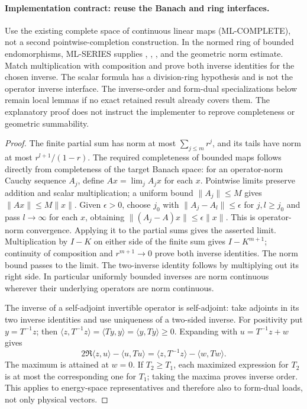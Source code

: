 \documentclass[11pt,a4paper]{article}
\theoremstyle{remark}\newtheorem{remark}[theorem]{Remark}
\begin{document}
\paragraph{Implementation contract: reuse the Banach and ring interfaces.}
Use the existing complete space of continuous linear maps (ML-COMPLETE), not a second pointwise-completion construction. In the normed ring of bounded endomorphisms, ML-SERIES supplies , , , and the geometric norm estimate. Match multiplication with composition and prove both inverse identities for the chosen inverse. The scalar formula  has a division-ring hypothesis and is not the operator inverse interface. The inverse-order and form-dual specializations below remain local lemmas if no exact retained result already covers them. The explanatory proof does not instruct the implementer to reprove completeness or geometric summability.
\begin{proof}
The finite partial sum has norm at most $\sum_{j\leq m}r^j$, and its tails have norm at most $r^{l+1}/(1-r)$. The required completeness of bounded maps follows directly from completeness of the target Banach space: for an operator-norm Cauchy sequence $A_j$, define $Ax=\lim_j A_jx$ for each $x$. Pointwise limits preserve addition and scalar multiplication; a uniform bound $\|A_j\|\leq M$ gives $\|Ax\|\leq M\|x\|$. Given $\epsilon>0$, choose $j_0$ with $\|A_j-A_l\|\leq\epsilon$ for $j,l\geq j_0$ and pass $l\to\infty$ for each $x$, obtaining $\|(A_j-A)x\|\leq\epsilon\|x\|$. This is operator-norm convergence. Applying it to the partial sums gives the asserted limit. Multiplication by $I-K$ on either side of the finite sum gives $I-K^{m+1}$; continuity of composition and $r^{m+1}\to0$ prove both inverse identities. The norm bound passes to the limit. The two-inverse identity follows by multiplying out its right side. In particular uniformly bounded inverses are norm continuous wherever their underlying operators are norm continuous.

The inverse of a self-adjoint invertible operator is self-adjoint: take adjoints in its two inverse identities and use uniqueness of a two-sided inverse. For positivity put $y=T^{-1}z$; then $\langle z,T^{-1}z\rangle=\langle Ty,y\rangle=\langle y,Ty\rangle\geq0$. Expanding with $u=T^{-1}z+w$ gives
\[
 2\Re\langle z,u\rangle-\langle u,Tu\rangle
 =\langle z,T^{-1}z\rangle-\langle w,Tw\rangle.
\]
The maximum is attained at $w=0$. If $T_2\geq T_1$, each maximized expression for $T_2$ is at most the corresponding one for $T_1$; taking the maxima proves inverse order. This applies to energy-space representatives and therefore also to form-dual loads, not only physical vectors.
\end{proof}
\end{document}
